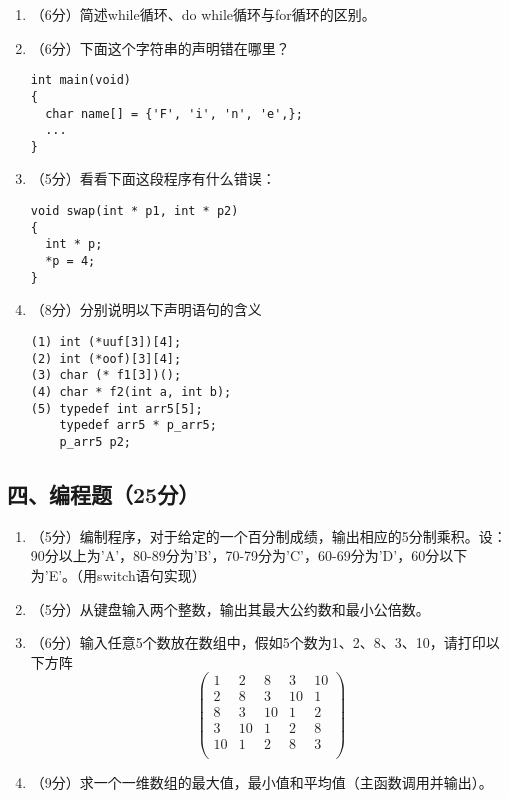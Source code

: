 \documentclass[8pt]{article}
\begin{document}
\begin{CJK}{UTF8}{gkai}
\begin{enumerate}
\item （6分）简述while循环、do while循环与for循环的区别。

\item （6分）下面这个字符串的声明错在哪里？
\begin{lstlisting}
int main(void) 
{
  char name[] = {'F', 'i', 'n', 'e',};
  ...
}
\end{lstlisting}
\item （5分）看看下面这段程序有什么错误：
\begin{lstlisting}
void swap(int * p1, int * p2)
{
  int * p;
  *p = 4;
}
\end{lstlisting}
\item （8分）分别说明以下声明语句的含义
\begin{lstlisting}
(1) int (*uuf[3])[4];
(2) int (*oof)[3][4]; 
(3) char (* f1[3])();
(4) char * f2(int a, int b);
(5) typedef int arr5[5];
    typedef arr5 * p_arr5;
    p_arr5 p2;
\end{lstlisting}

\end{enumerate}


\subsection*{四、编程题（25分）}

\begin{enumerate}
\item （5分）编制程序，对于给定的一个百分制成绩，输出相应的5分制乘积。设：90分以上为'A'，80-89分为'B'，70-79分为'C'，60-69分为'D'，60分以下为'E'。（用switch语句实现）
 

\item （5分）从键盘输入两个整数，输出其最大公约数和最小公倍数。
 

\item （6分）输入任意5个数放在数组中，假如5个数为1、2、8、3、10，请打印以下方阵
$$
\left(
\begin{array}{rrrrr}
1&2&8&3&10\\
2&8&3&10&1\\
8&3&10&1&2\\
3&10&1&2&8\\
10&1&2&8&3\\
\end{array}
\right)
$$
 


\item （9分）求一个一维数组的最大值，最小值和平均值（主函数调用并输出）。
 
\end{enumerate}


\end{CJK}
\end{document}
